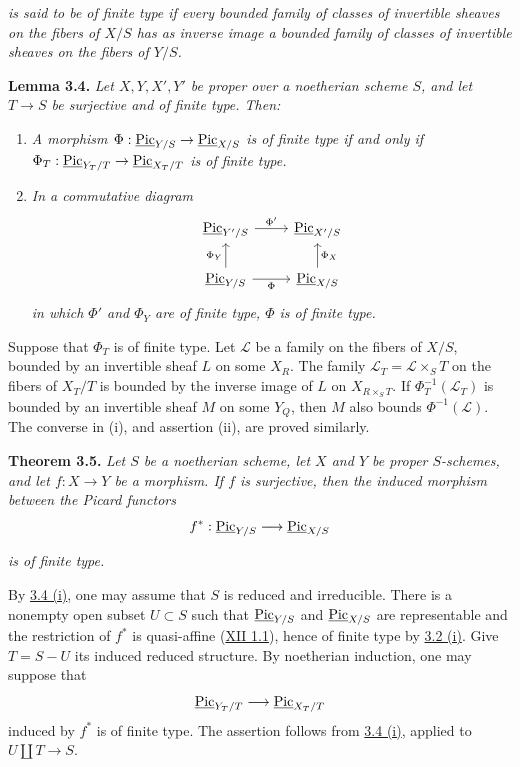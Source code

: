 
\emph{is said to be of finite type if every bounded family of classes of
invertible sheaves on the fibers of \(X/S\) has as inverse image a bounded
family of classes of invertible sheaves on the fibers of \(Y/S\).}

\textbf{Lemma 3.4.} \emph{Let \(X,Y,X',Y'\) be proper over a noetherian
scheme \(S\), and let \(T\to S\) be surjective and of finite type. Then:}
\begin{enumerate}[label=(\roman*)]
\item \emph{A morphism
\(\Phi:\underline{\operatorname{Pic}}_{Y/S}\to\underline{\operatorname{Pic}}_{X/S}\)
is of finite type if and only if
\(\Phi_T:\underline{\operatorname{Pic}}_{Y_T/T}\to\underline{\operatorname{Pic}}_{X_T/T}\)
is of finite type.}
\item \emph{In a commutative diagram}
\[
\begin{tikzcd}
\underline{\Pic}_{Y'/S}\arrow[r,"\Phi'"]&
\underline{\Pic}_{X'/S}\\
\underline{\Pic}_{Y/S}\arrow[r,"\Phi"']\arrow[u,"\Phi_Y"]&
\underline{\Pic}_{X/S}\arrow[u,"\Phi_X"']
\end{tikzcd}
\]
\emph{in which \(\Phi'\) and \(\Phi_Y\) are of finite type, \(\Phi\) is
of finite type.}
\end{enumerate}

Suppose that \(\Phi_T\) is of finite type. Let \(\mathscr L\) be a family
on the fibers of \(X/S\), bounded by an invertible sheaf \(L\) on some
\(X_R\). The family \(\mathscr L_T=\mathscr L\times_S T\) on the fibers of
\(X_T/T\) is bounded by the inverse image of \(L\) on
\(X_{R\times_S T}\). If \(\Phi_T^{-1}(\mathscr L_T)\) is bounded by an
invertible sheaf \(M\) on some \(Y_Q\), then \(M\) also bounds
\(\Phi^{-1}(\mathscr L)\). The converse in (i), and assertion (ii), are
proved similarly.

\textbf{Theorem 3.5.} \emph{Let \(S\) be a noetherian scheme, let \(X\)
and \(Y\) be proper \(S\)-schemes, and let \(f:X\to Y\) be a morphism. If
\(f\) is surjective, then the induced morphism between the Picard
functors}
\[
f^*:\underline{\operatorname{Pic}}_{Y/S}\longrightarrow\underline{\operatorname{Pic}}_{X/S}
\]

\emph{is of finite type.}

By \hyperlink{sga6.e13.lem.3-4}{3.4 (i)}, one may assume that \(S\) is reduced and irreducible. There
is a nonempty open subset \(U\subset S\) such that
\(\underline{\operatorname{Pic}}_{Y/S}\) and \(\underline{\operatorname{Pic}}_{X/S}\) are
representable and the restriction of \(f^*\) is quasi-affine (\hyperlink{sga6.e12.thm.1-1}{XII 1.1}),
hence of finite type by \hyperlink{sga6.e13.prop.3-2}{3.2 (i)}. Give \(T=S-U\) its induced reduced
structure. By noetherian induction, one may suppose that
\[
\underline{\operatorname{Pic}}_{Y_T/T}\longrightarrow\underline{\operatorname{Pic}}_{X_T/T}
\]
induced by \(f^*\) is of finite type. The assertion follows from \hyperlink{sga6.e13.lem.3-4}{3.4 (i)},
applied to \(U\amalg T\to S\).

